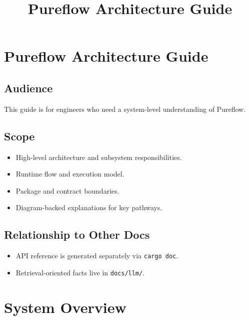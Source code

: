 \documentclass[
  letterpaper,
]{report}
\title{Pureflow Architecture Guide}
\author{}
\date{}
\providecommand{\tightlist}{%
  \setlength{\itemsep}{0pt}\setlength{\parskip}{0pt}}
\renewcommand*\contentsname{Table of contents}
\newcommand\contentsname{Table of contents}
\begin{document}
\maketitle

\renewcommand*\contentsname{Table of contents}
{
\hypersetup{linkcolor=}
\setcounter{tocdepth}{2}
\tableofcontents
}


\chapter{Pureflow Architecture Guide}\label{pureflow-architecture-guide}

\section{Audience}\label{audience}

This guide is for engineers who need a system-level understanding of
Pureflow.

\section{Scope}\label{scope}

\begin{itemize}
\tightlist
\item
  High-level architecture and subsystem responsibilities.
\item
  Runtime flow and execution model.
\item
  Package and contract boundaries.
\item
  Diagram-backed explanations for key pathways.
\end{itemize}

\section{Relationship to Other Docs}\label{relationship-to-other-docs}

\begin{itemize}
\tightlist
\item
  API reference is generated separately via \texttt{cargo\ doc}.
\item
  Retrieval-oriented facts live in \texttt{docs/llm/}.
\end{itemize}


\chapter{System Overview}\label{system-overview}
\end{document}
